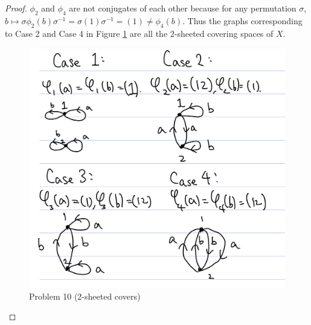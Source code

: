 \documentclass[12pt, psamsfonts]{amsart}
\theoremstyle{definition}
\theoremstyle{remark}
\numberwithin{equation}{section}
\begin{document}
\begin{proof}
  $\phi_2$ and $\phi_4$ are not conjugates of each other because for any permutation $\sigma$, $b \mapsto \sigma\phi_2(b)\sigma^{-1} = \sigma(1)\sigma^{-1} = (1) \ne \phi_4(b)$.
  Thus the graphs corresponding to Case 2 and Case 4 in Figure \ref{fig:problem10_2_sheeted} are all the 2-sheeted covering spaces of $X$.
  \begin{figure}
    \includegraphics[width=.5\linewidth]{problem10_2_sheeted.jpeg}
    \caption{Problem 10 (2-sheeted covers)}
    \label{fig:problem10_2_sheeted}
  \end{figure}


\end{proof}
\end{document}
